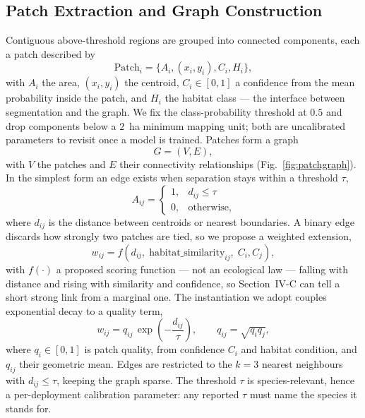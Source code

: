 \documentclass[conference]{IEEEtran}
\begin{document}
\subsection{Patch Extraction and Graph Construction}

Contiguous above-threshold regions are grouped into connected components, each a patch described by
\begin{equation}
\text{Patch}_i = \{A_i, (x_i, y_i), C_i, H_i\},
\label{eq:patch}
\end{equation}
with $A_i$ the area, $(x_i, y_i)$ the centroid, $C_i \in [0,1]$ a confidence from the mean probability inside the patch, and $H_i$ the habitat class --- the interface between segmentation and the graph. We fix the class-probability threshold at $0.5$ and drop components below a $2$~ha minimum mapping unit; both are uncalibrated parameters to revisit once a model is trained. Patches form a graph
\begin{equation}
G = (V, E),
\label{eq:graph}
\end{equation}
with $V$ the patches and $E$ their connectivity relationships (Fig.~\ref{fig:patchgraph}). In the simplest form an edge exists when separation stays within a threshold $\tau$,
\begin{equation}
A_{ij} =
\begin{cases}
1, & d_{ij} \leq \tau \\
0, & \text{otherwise},
\end{cases}
\label{eq:binary_edge}
\end{equation}
where $d_{ij}$ is the distance between centroids or nearest boundaries. A binary edge discards how strongly two patches are tied, so we propose a weighted extension,
\begin{equation}
w_{ij} = f(d_{ij}, \; \text{habitat\_similarity}_{ij}, \; C_i, C_j),
\label{eq:weighted_edge}
\end{equation}
with $f(\cdot)$ a proposed scoring function --- not an ecological law --- falling with distance and rising with similarity and confidence, so Section~IV-C can tell a short strong link from a marginal one. The instantiation we adopt couples exponential decay to a quality term,
\begin{equation}
w_{ij} = q_{ij} \, \exp\!\left(-\frac{d_{ij}}{\tau}\right), \qquad q_{ij} = \sqrt{q_i q_j},
\label{eq:decay}
\end{equation}
where $q_i \in [0,1]$ is patch quality, from confidence $C_i$ and habitat condition, and $q_{ij}$ their geometric mean. Edges are restricted to the $k = 3$ nearest neighbours with $d_{ij} \leq \tau$, keeping the graph sparse. The threshold $\tau$ is species-relevant, hence a per-deployment calibration parameter: any reported $\tau$ must name the species it stands for.
\end{document}
